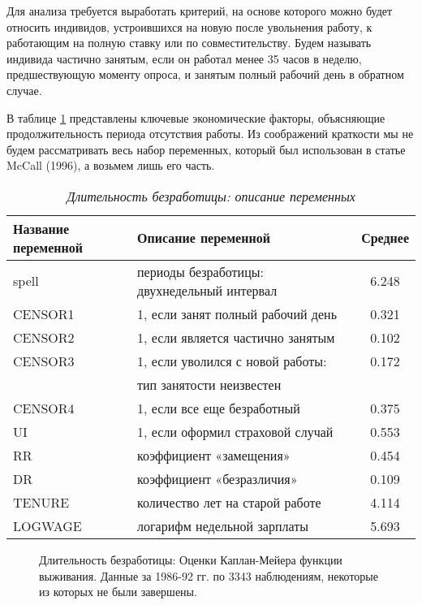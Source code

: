 Для анализа требуется выработать критерий, на основе которого можно будет относить индивидов, устроившихся на новую после увольнения работу, к работающим на полную ставку или по совместительству. Будем называть индивида частично занятым, если он работал менее 35 часов в неделю, предшествующую моменту опроса, и занятым полный рабочий день в обратном случае.

В таблице \ref{tab:17.6} представлены ключевые экономические факторы, объясняющие продолжительность периода отсутствия работы. Из соображений краткости мы не будем рассматривать весь набор переменных, который был использован в статье McCall (1996), а возьмем лишь его часть.
    \begin{table}[!htbp]\caption{\textit{Длительность безработицы: описание переменных}}\label{tab:17.6}
    \begin{center}
\begin{tabular}{llc}
\hline \hline
\textbf{Название переменной}&\textbf{Описание переменной}           &\textbf{Среднее}\\
\hline
spell       &периоды безработицы: двухнедельный интервал            &6.248\\
CENSOR1     &1, если занят полный рабочий день                      &0.321\\
CENSOR2     &1, если является частично занятым                      &0.102\\
CENSOR3     &1, если уволился с новой работы:                       &0.172\\
            &тип занятости неизвестен                               &\\
CENSOR4     &1, если все еще безработный                            &0.375\\
UI          &1, если оформил страховой случай                       &0.553\\
RR          &коэффициент «замещения»                                &0.454\\
DR          &коэффициент «безразличия»                              &0.109\\
TENURE      &количество лет на старой работе                        &4.114\\
LOGWAGE     &логарифм недельной зарплаты                            &5.693\\
\hline \hline
\end{tabular}
    \end{center}
    \end{table}

\begin{figure}[ht!]\caption{Длительность безработицы: Оценки Каплан-Мейера функции выживания. Данные за 1986-92 гг. по 3343 наблюдениям, некоторые из которых не были завершены.}\label{fig:17.3}
\centering
\end{figure}

